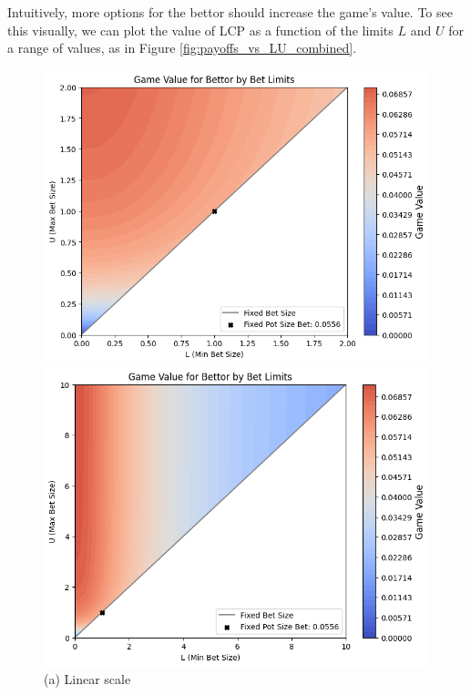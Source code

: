 \documentclass[../../main/main.tex]{subfiles}
\begin{document}
Intuitively, more options for the bettor should increase the game's value. To see this visually, we can plot the value of LCP as a function of the limits $L$ and $U$ for a range of values, as in Figure \ref{fig:payoffs_vs_LU_combined}.

\begin{figure}[h!]
    \begin{adjustwidth}{-1in}{-1in}
        \centering
        \begin{minipage}{0.6\textwidth}
            \centering
            \includegraphics[width=\textwidth]{payoffs_by_limits.png}
            \caption*{(a) Linear scale}
        \end{minipage}
        \hspace{0.05\textwidth}
        \begin{minipage}{0.6\textwidth}
            \centering
            \includegraphics[width=\textwidth]{payoffs_by_limits_wide.png}

\end{minipage}
\end{adjustwidth}
\end{figure}
\end{document}
